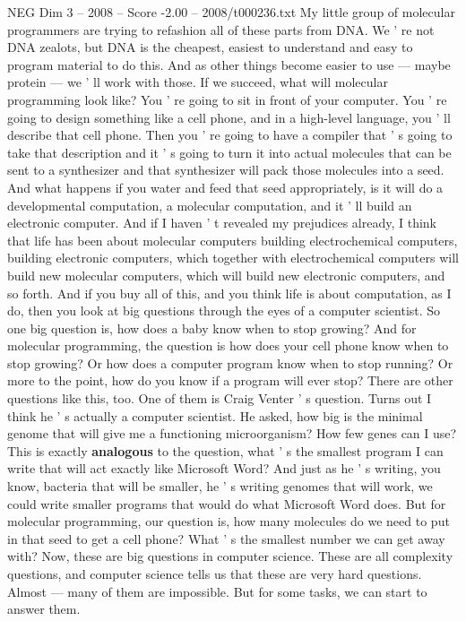 \begin{textsample}{NEG Dim 3 – 2008 – Score -2.00 – 2008/t000236.txt}
My little group of molecular programmers are trying to refashion all of these parts from DNA.
We ' re not DNA zealots, but DNA is the cheapest, easiest to understand and easy to program material to do this.
And as other things become easier to use — maybe protein — we ' ll work with those.
If we succeed, what will molecular programming look like?
You ' re going to sit in front of your computer.
You ' re going to design something like a cell phone, and in a high-level language, you ' ll describe that cell phone.
Then you ' re going to have a compiler that ' s going to take that description and it ' s going to turn it into actual molecules that can be sent to a synthesizer and that synthesizer will pack those molecules into a seed.
And what happens if you water and feed that seed appropriately, is it will do a developmental computation, a molecular computation, and it ' ll build an electronic computer.
And if I haven ' t revealed my prejudices already, I think that life has been about molecular computers building electrochemical computers, building electronic computers, which together with electrochemical computers will build new molecular computers, which will build new electronic computers, and so forth.
And if you buy all of this, and you think life is about computation, as I do, then you look at big questions through the eyes of a computer scientist.
So one big question is, how does a baby know when to stop growing?
And for molecular programming, the question is how does your cell phone know when to stop growing?
Or how does a computer program know when to stop running?
Or more to the point, how do you know if a program will ever stop?
There are other questions like this, too.
One of them is Craig Venter ' s question.
Turns out I think he ' s actually a computer scientist.
He asked, how big is the minimal genome that will give me a functioning microorganism?
How few genes can I use?
This is exactly \textbf{analogous} to the question, what ' s the smallest program I can write that will act exactly like Microsoft Word?
And just as he ' s writing, you know, bacteria that will be smaller, he ' s writing genomes that will work, we could write smaller programs that would do what Microsoft Word does.
But for molecular programming, our question is, how many molecules do we need to put in that seed to get a cell phone?
What ' s the smallest number we can get away with?
Now, these are big questions in computer science.
These are all complexity questions, and computer science tells us that these are very hard questions.
Almost — many of them are impossible.
But for some tasks, we can start to answer them.

\end{textsample}

